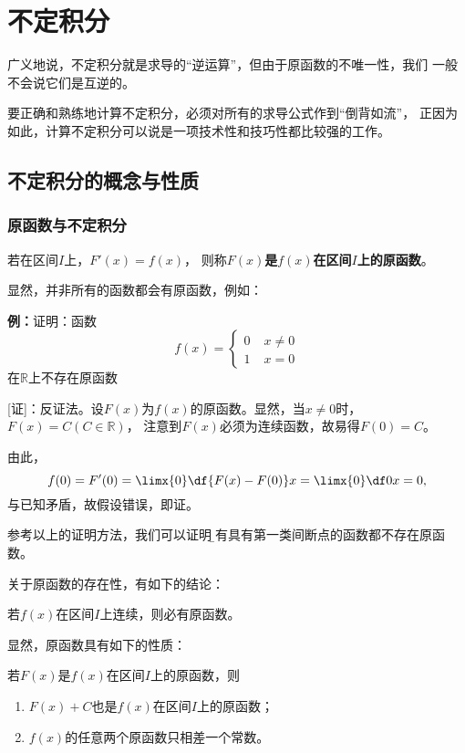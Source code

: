\setcounter{chapter}{3}

\chapter{不定积分}

广义地说，不定积分就是求导的“逆运算”，但由于原函数的不唯一性，我们
一般不会说它们是互逆的。

要正确和熟练地计算不定积分，必须对所有的求导公式作到“倒背如流”，
正因为如此，计算不定积分可以说是一项技术性和技巧性都比较强的工作。

\section{不定积分的概念与性质}

\subsection{原函数与不定积分}

\begin{thx}
	若在区间$I$上，$F'(x)=f(x)$，
	则称{\bf $F(x)$是$f(x)$在区间$I$上的原函数}。
\end{thx}

显然，并非所有的函数都会有原函数，例如：

{\bf 例：}证明：函数$$f(x)=\left\{\begin{array}{ll}
0\;& x\ne 0\\1\;& x=0\end{array}\right.$$在$\mathbb{R}$上不存在原函数

[证]：反证法。设$F(x)$为$f(x)$的原函数。显然，当$x\ne0$时，$F(x)=C(C\in\mathbb{R})$，
注意到$F(x)$必须为连续函数，故易得$F(0)=C$。

由此，
$$f(0)=F'(0)=\limx{0}\df{F(x)-F(0)}x=\limx{0}\df0x=0,$$
与已知矛盾，故假设错误，即证。\fin

参考以上的证明方法，我们可以证明{\b 所有具有第一类间断点的函数都不存在原函数}。

关于原函数的存在性，有如下的结论：

\begin{thx}
	若$f(x)$在区间$I$上连续，则必有原函数。
\end{thx}

显然，原函数具有如下的性质：

\begin{thx}
	若$F(x)$是$f(x)$在区间$I$上的原函数，则
	\begin{enumerate}
	  \item $F(x)+C$也是$f(x)$在区间$I$上的原函数；
	  \item $f(x)$的任意两个原函数只相差一个常数。
	\end{enumerate}
\end{thx}

